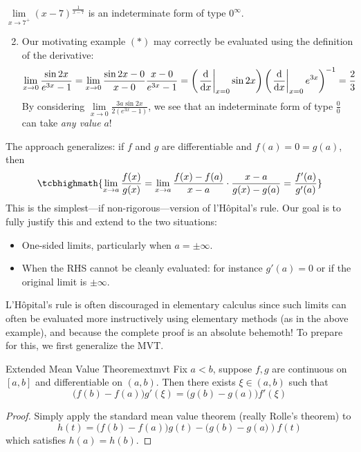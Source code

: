 \begin{examples}{}{}
	\exstart $\lim\limits_{x\to 7^+}(x-7)^\frac 1{x-7}$ is an indeterminate form of type $0^\infty$.
	\begin{enumerate}\setcounter{enumi}{1}
	  \item Our motivating example $(\ast)$ may correctly be evaluated using the definition of the derivative:
		\[
			\lim_{x\to 0}\frac{\sin 2x}{e^{3x}-1}
			=\lim_{x\to 0}\frac{\sin 2x-0}{x-0}\frac{x-0}{e^{3x}-1} 
			=\left(\left.\frac{\mathrm{d} }{\mathrm{d} x}\right|_{x=0}\sin 2x\right) \left(\left.\frac{\mathrm{d} }{\mathrm{d} x}\right|_{x=0}e^{3x}\right)^{-1} 
			=\frac 23
		\]
		By considering $\lim\limits_{x\to 0}\frac{3a\sin 2x}{2(e^{3x}-1)}$, we see that an indeterminate form of type $\frac 00$ can take \emph{any value} $a$!
	\end{enumerate}
\end{examples}

The approach generalizes: if $f$ and $g$ are differentiable and $f(a)=0=g(a)$, then
\[
	\tcbhighmath{%
		\lim_{x\to a}\frac{f(x)}{g(x)}
		=\lim_{x\to a}\frac{f(x)-f(a)}{x-a}\cdot \frac{x-a}{g(x)-g(a)} 
		=\frac{f'(a)}{g'(a)}
	}
\]
This is the simplest---if non-rigorous---version of l'Hôpital's rule. Our goal is to fully justify this and extend to the two situations:
\begin{itemize}
  \item One-sided limits, particularly when $a=\pm\infty$.
  \item When the RHS cannot be cleanly evaluated: for instance $g'(a)=0$ or if the original limit is $\pm\infty$.
\end{itemize}

L'Hôpital's rule is often discouraged in elementary calculus since such limits can often be evaluated more instructively using elementary methods (as in the above example), and because the complete proof is an absolute behemoth! To prepare for this, we first  generalize the MVT.

\begin{lemm}{Extended Mean Value Theorem}{extmvt}
	Fix $a<b$, suppose $f,g$ are continuous on $[a,b]$ and differentiable on $(a,b)$. Then there exists $\xi\in(a,b)$ such that
	\[
		\big(f(b)-f(a)\big)g'(\xi)=\big(g(b)-g(a)\big)f'(\xi)
	\] 
\end{lemm}

\begin{proof}
	Simply apply the standard mean value theorem (really Rolle's theorem) to
	\[
		h(t)=\bigl(f(b)-f(a)\bigr)g(t)-\bigl(g(b)-g(a\bigr))f(t)
	\]
	which satisfies $h(a)=h(b)$.
\end{proof}

